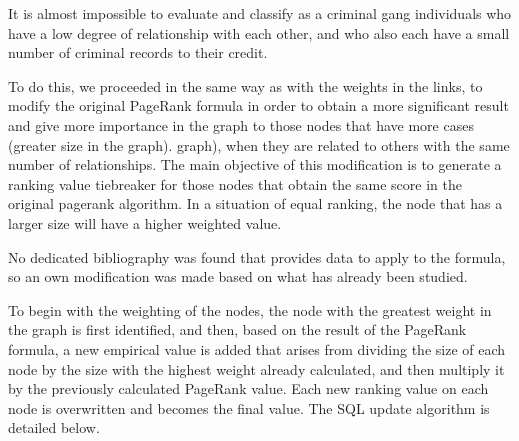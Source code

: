 It is almost impossible to evaluate and classify as a criminal gang individuals who have a low degree of relationship with each other, and who also each have a small number of criminal records to their credit.

To do this, we proceeded in the same way as with the weights in the links, to modify the original PageRank formula in order to obtain a more significant result and give more importance in the graph to those nodes that have more cases (greater size in the graph). graph), when they are related to others with the same number of relationships. The main objective of this modification is to generate a ranking value tiebreaker for those nodes that obtain the same score in the original pagerank algorithm. In a situation of equal ranking, the node that has a larger size will have a higher weighted value.

No dedicated bibliography was found that provides data to apply to the formula, so an own modification was made based on what has already been studied.

To begin with the weighting of the nodes, the node with the greatest weight in the graph is first identified, and then, based on the result of the PageRank formula, a new empirical value is added that arises from dividing the size of each node by the size with the highest weight already calculated, and then multiply it by the previously calculated PageRank value. Each new ranking value on each node is overwritten and becomes the final value. The SQL update algorithm is detailed below.

